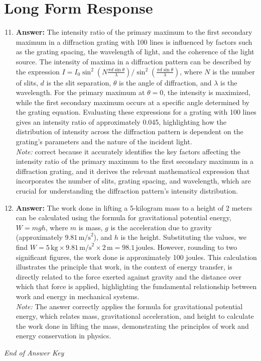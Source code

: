 \documentclass[12pt]{article}
\begin{document}
\section*{Long Form Response}
\begin{enumerate}[label=\arabic*.]
\setcounter{enumi}{10}
\item \textbf{Answer:} The intensity ratio of the primary maximum to the first secondary maximum in a diffraction grating with 100 lines is influenced by factors such as the grating spacing, the wavelength of light, and the coherence of the light source. The intensity of maxima in a diffraction pattern can be described by the expression \( I = I_0 \sin^2(N\frac{\pi d \sin\theta}{\lambda})/\sin^2(\frac{\pi d \sin\theta}{\lambda}) \), where \( N \) is the number of slits, \( d \) is the slit separation, \( \theta \) is the angle of diffraction, and \( \lambda \) is the wavelength. For the primary maximum at \( \theta = 0 \), the intensity is maximized, while the first secondary maximum occurs at a specific angle determined by the grating equation. Evaluating these expressions for a grating with 100 lines gives an intensity ratio of approximately 0.045, highlighting how the distribution of intensity across the diffraction pattern is dependent on the grating's parameters and the nature of the incident light.
\\ \textit{Note:} correct because it accurately identifies the key factors affecting the intensity ratio of the primary maximum to the first secondary maximum in a diffraction grating, and it derives the relevant mathematical expression that incorporates the number of slits, grating spacing, and wavelength, which are crucial for understanding the diffraction pattern's intensity distribution.
\item \textbf{Answer:} The work done in lifting a 5-kilogram mass to a height of 2 meters can be calculated using the formula for gravitational potential energy, \( W = mgh \), where \( m \) is mass, \( g \) is the acceleration due to gravity (approximately \( 9.81 \, \text{m/s}^2 \)), and \( h \) is the height. Substituting the values, we find \( W = 5 \, \text{kg} \times 9.81 \, \text{m/s}^2 \times 2 \, \text{m} = 98.1 \, \text{joules} \). However, rounding to two significant figures, the work done is approximately 100 joules. This calculation illustrates the principle that work, in the context of energy transfer, is directly related to the force exerted against gravity and the distance over which that force is applied, highlighting the fundamental relationship between work and energy in mechanical systems.
\\ \textit{Note:} The answer correctly applies the formula for gravitational potential energy, which relates mass, gravitational acceleration, and height to calculate the work done in lifting the mass, demonstrating the principles of work and energy conservation in physics.
\end{enumerate}

\vfill
\noindent\textit{End of Answer Key}
\end{document}
